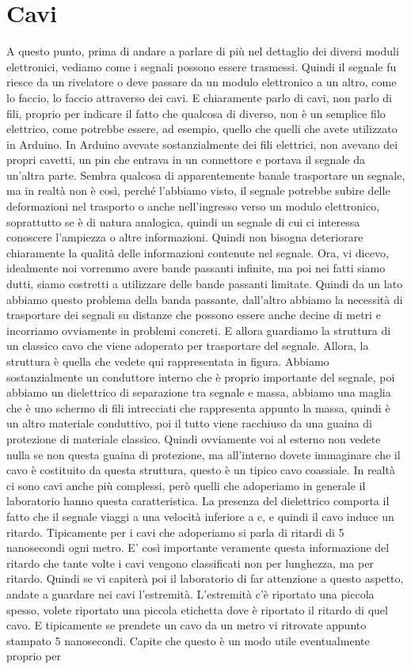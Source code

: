 {\section{Cavi}
A questo punto, prima di andare a parlare di più nel dettaglio dei diversi moduli elettronici, vediamo come i segnali possono essere trasmessi. Quindi il segnale fu riesce da un rivelatore o deve passare da un modulo elettronico a un altro, come lo faccio, lo faccio attraverso dei cavi. E chiaramente parlo di cavi, non parlo di fili, proprio per indicare il fatto che qualcosa di diverso, non è un semplice filo elettrico, come potrebbe essere, ad esempio, quello che quelli che avete utilizzato in Arduino. In Arduino avevate sostanzialmente dei fili elettrici, non avevano dei propri cavetti, un pin che entrava in un connettore e portava il segnale da un'altra parte. Sembra qualcosa di apparentemente banale trasportare un segnale, ma in realtà non è così, perché l'abbiamo visto, il segnale potrebbe subire delle deformazioni nel trasporto o anche nell'ingresso verso un modulo elettronico, soprattutto se è di natura analogica, quindi un segnale di cui ci interessa conoscere l'ampiezza o altre informazioni. Quindi non bisogna deteriorare chiaramente la qualità delle informazioni contenute nel segnale. Ora, vi dicevo, idealmente noi vorremmo avere bande passanti infinite, ma poi nei fatti siamo dutti, siamo costretti a utilizzare delle bande passanti limitate. Quindi da un lato abbiamo questo problema della banda passante, dall'altro abbiamo la necessità di trasportare dei segnali su distanze che possono essere anche decine di metri e incorriamo ovviamente in problemi concreti. E allora guardiamo la struttura di un classico cavo che viene adoperato per trasportare del segnale. Allora, la struttura è quella che vedete qui rappresentata in figura. Abbiamo sostanzialmente un conduttore interno che è proprio importante del segnale, poi abbiamo un dielettrico di separazione tra segnale e massa, abbiamo una maglia che è uno schermo di fili intrecciati che rappresenta appunto la massa, quindi è un altro materiale conduttivo, poi il tutto viene racchiuso da una guaina di protezione di materiale classico. Quindi ovviamente voi al esterno non vedete nulla se non questa guaina di protezione, ma all'interno dovete immaginare che il cavo è costituito da questa struttura, questo è un tipico cavo coassiale. In realtà ci sono cavi anche più complessi, però quelli che adoperiamo in generale il laboratorio hanno questa caratteristica. La presenza del dielettrico comporta il fatto che il segnale viaggi a una velocità inferiore a c, e quindi il cavo induce un ritardo. Tipicamente per i cavi che adoperiamo si parla di ritardi di 5 nanosecondi ogni metro. E' così importante veramente questa informazione del ritardo che tante volte i cavi vengono classificati non per lunghezza, ma per ritardo. Quindi se vi capiterà poi il laboratorio di far attenzione a questo aspetto, andate a guardare nei cavi l'estremità. L'estremità c'è riportato una piccola spesso, volete riportato una piccola etichetta dove è riportato il ritardo di quel cavo. E tipicamente se prendete un cavo da un metro vi ritrovate appunto stampato 5 nanosecondi. Capite che questo è un modo utile eventualmente proprio per }
